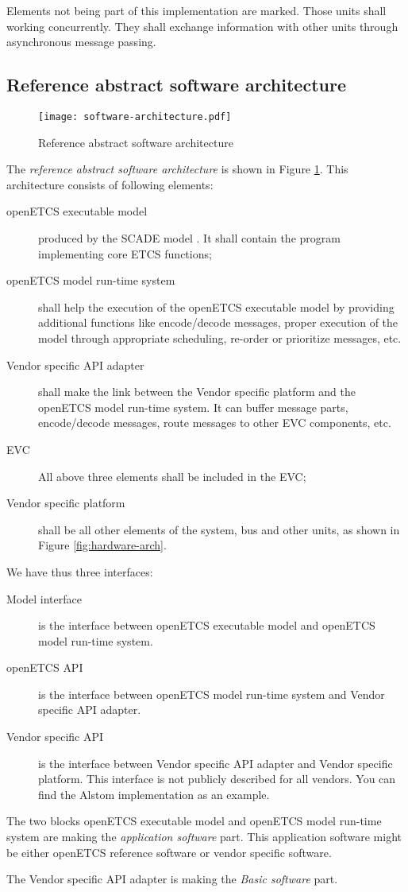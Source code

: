 Elements not being part of this implementation are marked. Those units shall working concurrently. They shall exchange information with other units through asynchronous message passing.

\subsection{Reference abstract software architecture}
\label{software-arch}

\begin{figure}
  \centering
  \texttt{[image: software-architecture.pdf]}
  \caption{Reference abstract software architecture}
  \label{fig:software-arch}
\end{figure}

The \emph{reference abstract software architecture} is shown in Figure
\ref{fig:software-arch}. This architecture consists of following
elements:
\begin{description}
\item[openETCS executable model] produced by the SCADE model \cite{scade-model}. It shall contain the program implementing core
  ETCS functions;
\item[openETCS model run-time system] shall help the execution
  of the openETCS executable model by providing additional functions
  like encode/decode messages, proper execution of the model through
  appropriate scheduling, re-order or prioritize messages, etc. 
\item[Vendor specific API adapter] shall make the link between
  the Vendor specific platform and the openETCS model run-time system.
  It can buffer message parts, encode/decode messages, route messages
  to other EVC components, etc.
\item[EVC] All above three elements shall be included in the EVC;
\item[Vendor specific platform] shall be all other elements of
  the system, bus and other units, as shown in Figure \ref{fig:hardware-arch}.
\end{description}

We have thus three interfaces:
\begin{description}
\item[Model interface]
 is the interface between openETCS executable model and openETCS model run-time system. 
\item[openETCS {API}]
 is the interface between openETCS model run-time system and Vendor specific {API} adapter.
\item[Vendor specific {API}]
 is the interface between Vendor specific {API} adapter and Vendor specific platform. This interface is not publicly described for all vendors. You can find the Alstom implementation as an example.
\end{description}

The two blocks openETCS executable model and openETCS model run-time
system are making the \emph{application software} part. This application software might be either openETCS reference software or vendor specific software.

The Vendor specific API adapter is making the \emph{Basic software} part.



